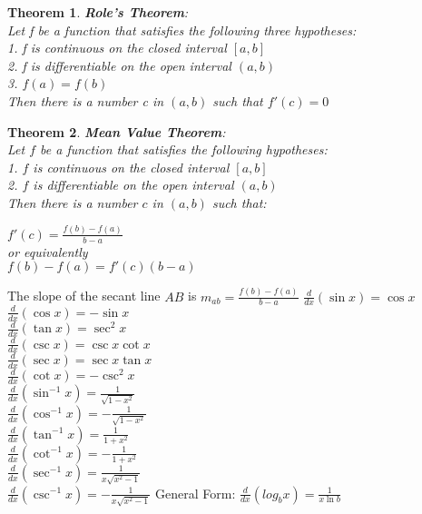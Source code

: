 \documentclass[10pt,a4paper]{article}
\newtheorem{theorem}{Theorem}
\begin{document}
	\begin{theorem}
		\textbf{Role's Theorem}:
		\\Let \textit{f} be a function that satisfies the following three hypotheses:
		\\1. \textit{f} is continuous on the closed interval $[a,b]$
		\\2. \textit{f} is differentiable on the open interval $(a,b)$
		\\3. $f(a) = f(b)$
		\\ Then there is a number \textit{c} in $(a,b)$ such that $f'(c)=0$	
	\end{theorem}
	\begin{theorem}
		\textbf{Mean Value Theorem}:
		\\Let $f$ be a function that satisfies the following hypotheses:
		\\1. $f$ is continuous on the closed interval $[a,b]$
		\\2. $f$ is differentiable on the open interval $(a,b)$
		\\ Then there is a number $c$ in $(a,b)$ such that:
		\begin{center}
			$f'(c)= \frac{f(b)-f(a)}{b-a}$
			\\or equivalently
			\\$f(b)-f(a) = f'(c)(b-a)$
		\end{center}
	\end{theorem}
	The slope of the secant line $AB$ is $m_{ab}=\frac{f(b)-f(a)}{b-a}$
	$\frac{d}{dx}(\sin{x}) = \cos{x}$
	\\	$\frac{d}{dx}(\cos{x}) = -\sin{x}$
	\\	$\frac{d}{dx}(\tan{x}) = \sec^{2}{x}$
	\\	$\frac{d}{dx}(\csc{x}) = \csc{x}\cot{x}$
	\\	$\frac{d}{dx}(\sec{x})= \sec{x}\tan{x}$
	\\	$\frac{d}{dx}(\cot{x}) = -\csc^{2}{x}$
	\\	$\frac{d}{dx}(\sin^{-1}{x}) = \frac{1}{\sqrt{1-x^{2}}}$
	\\	$\frac{d}{dx}(\cos^{-1}{x}) = -\frac{1}{\sqrt{1-x^{2}}}$
	\\	$\frac{d}{dx}(\tan^{-1}{x}) = \frac{1}{1+x^{2}}$
	\\ $\frac{d}{dx}(\cot^{-1}{x}) = -\frac{1}{1+x^{2}}$
	\\ $\frac{d}{dx}(\sec^{-1}{x}) = \frac{1}{x\sqrt{x^{2}-1}}$
	\\ $\frac{d}{dx}(\csc^{-1}{x}) = -\frac{1}{x\sqrt{x^{2}-1}}$
	General Form: $\frac{d}{dx}(log_{b}{x}) = \frac{1}{x\ln{b}}$
\end{document}
